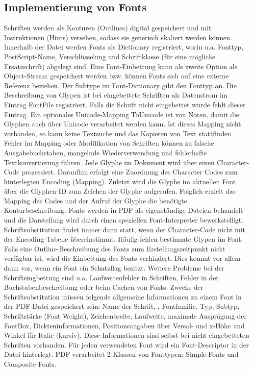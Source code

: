 \subsection{Implementierung von Fonts}
Schriften werden als Konturen (Outlines) digital gespeichert und mit Instruktionen (Hints) versehen, sodass sie generisch skaliert werden können. Innerhalb der Datei werden Fonts als Dictionary registriert, worin u.a. Fonttyp, PostScript-Name, Verschlüsselung und Schriftklasse (für eine mögliche Ersatzschrift) abgelegt sind. Eine Font-Einbettung kann als zweite Option als Object-Stream gespeichert werden bzw. können Fonts sich auf eine externe Referenz beziehen. Der Subtype im Font-Dictionary gibt den Fonttyp an. Die Beschreibung von Glypen ist bei eingebettete Schriften als Datenstrom im Eintrag FontFile registriert. Falls die Schrift nicht eingebettet wurde fehlt dieser Eintrag. Ein optionales Unicode-Mapping ToUnicode ist von Nöten, damit die Glyphen auch über Unicode verarbeitet werden kann. Ist dieses Mapping nicht vorhanden, so kann keine Textsuche und das Kopieren von Text stattfinden. Fehler im Mapping oder Modifikation von Schriften können zu falsche Ausgabebuchstaben, mangelnde Wiederverwendung und fehlerhafte Textkonvertierung führen. Jede Glyphe im Dokument wird über einen Character-Code prozessiert. Daraufhin erfolgt eine Zuordnung des Character Codes zum hinterlegten Encoding (Mapping). Zuletzt wird die Glyphe im aktuellen Font über die Glyphen-ID zum Zeichen der Glyphe aufgerufen. Folglich erzielt das Mapping des Codes und der Aufruf der Glyphe die benötigte Konturbeschreibung. Fonts werden in PDF als eigenständige Dateien behandelt und die Darstellung wird durch einen speziellen Font-Interpreter bewerkstelligt. Schriftsubstitution findet immer dann statt, wenn der Character-Code nicht mit der Encoding-Tabelle übereinstimmt. Häufig fehlen bestimmte Glypen im Font. Falls eine Outline-Beschreibung des Fonts zum Erstellungszeitpunkt nicht verfügbar ist, wird die Einbettung des Fonts verhindert. Dies kommt vor allem dann vor, wenn ein Font ein Schutzflag besitzt. Weitere Probleme bei der Schrifteingbettung sind u.a. Laufweitenfehler in Schriften, Fehler in der Buchstabenbeschreibung oder beim Cachen von Fonts. Zwecks der Schriftsubstitution müssen folgende allgemeine Informationen zu einem Font in der PDF-Datei gespeichert sein: Name der Schrift, , Fontfamilie, Typ, Subtyp, Schriftstärke (Font Weight), Zeichenbreite, Laufweite, maximale Ausprägung der FontBox, Dickteninformationen, Positionsangaben über Versal- und x-Höhe und Winkel für Italic (kursiv). Diese Informationen sind selbst bei nicht eingebetteten Schriften vorhanden. Für jeden verwendeten Font wird ein Font-Descriptor in der Datei hinterlegt. PDF verarbeitet 2 Klassen von Fonttypen: Simple-Fonts und Composite-Fonts. \cite{schneeberger} 